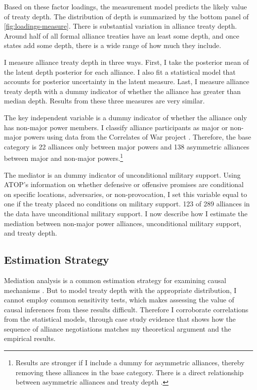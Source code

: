 \documentclass[12pt]{article}
\begin{document}
Based on these factor loadings, the measurement model predicts the likely value of treaty depth. 
The distribution of depth is summarized by the bottom panel of \autoref{fig:loadings-measure}. 
There is substantial variation in alliance treaty depth. 
Around half of all formal alliance treaties have an least some depth, and once states add some depth, there is a wide range of how much they include.


I measure alliance treaty depth in three ways.
First, I take the posterior mean of the latent depth posterior for each alliance. 
I also fit a statistical model that accounts for posterior uncertainty in the latent measure. 
Last, I measure alliance treaty depth with a dummy indicator of whether the alliance has greater than median depth. 
Results from these three measures are very similar. 


The key independent variable is a dummy indicator of whether the alliance only has non-major power members. 
I classify alliance participants as major or non-major powers using data from the Correlates of War project \citep{SingerCINC1988}.
Therefore, the base category is 22 alliances only between major powers and 138 asymmetric alliances between major and non-major powers.\footnote{Results are stronger if I include a dummy for asymmetric alliances, thereby removing these alliances in the base category. There is a direct relationship between asymmetric alliances and treaty depth \citep{Mattes2012}.}  


The mediator is an dummy indicator of unconditional military support. 
Using ATOP's information on whether defensive or offensive promises are conditional on specific locations, adversaries, or non-provocation, I set this variable equal to one if the treaty placed no conditions on military support.
123 of 289 alliances in the data have unconditional military support. 
I now describe how I estimate the mediation between non-major power alliances, unconditional military support, and treaty depth. 


\subsection{Estimation Strategy}

Mediation analysis is a common estimation strategy for examining causal mechanisms \citep{Imaietal2011}. 
But to model treaty depth with the appropriate distribution, I cannot employ common sensitivity tests, which makes assessing the value of causal inferences from these results difficult. 
Therefore I corroborate correlations from the statistical models, through case study evidence that shows how the sequence of alliance negotiations matches my theoretical argument and the empirical results. 
\end{document}
